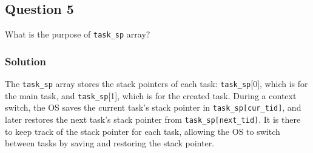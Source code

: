 \subsection*{Question 5}

What is the purpose of \texttt{task\_sp} array?

\subsubsection*{Solution}

The \texttt{task\_sp} array stores the stack pointers of each task:
\texttt{task\_sp}[0], which is for the main task, and \texttt{task\_sp}[1], which is for the created task.
During a context switch, the OS saves the current task's stack pointer in \texttt{task\_sp[cur\_tid]}, and later restores the next task's stack pointer from \texttt{task\_sp[next\_tid]}.
It is there to keep track of the stack pointer for each task, allowing the OS to switch between tasks by saving and restoring the stack pointer.
